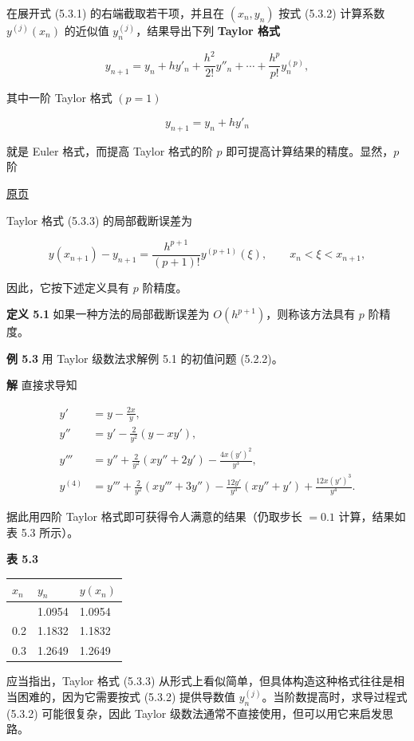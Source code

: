\documentclass[
  10pt,
  fontset=fandol]{ctexart}
\newcounter{none} %
\begin{document}
在展开式 (5.3.1) 的右端截取若干项，并且在 \((x_n,y_n)\) 按式 (5.3.2) 计算系数 \(y^{(j)}(x_n)\) 的近似值 \(y_n^{(j)}\)，结果导出下列 \textbf{Taylor 格式}

\[
y_{n+1}=y_n+hy'_n+\frac{h^2}{2!}y''_n+\cdots+\frac{h^p}{p!}y_n^{(p)},\tag{5.3.3}
\]

其中一阶 Taylor 格式 \((p=1)\)

\[
y_{n+1}=y_n+hy'_n
\]

就是 Euler 格式，而提高 Taylor 格式的阶 \(p\) 即可提高计算结果的精度。显然，\(p\) 阶

\href{../../source-images/pdf-127.jpeg}{原页}

Taylor 格式 (5.3.3) 的局部截断误差为

\[
y(x_{n+1})-y_{n+1}=\frac{h^{p+1}}{(p+1)!}y^{(p+1)}(\xi),\qquad x_n<\xi<x_{n+1},
\]

因此，它按下述定义具有 \(p\) 阶精度。

\textbf{定义 5.1} 如果一种方法的局部截断误差为 \(O(h^{p+1})\)，则称该方法具有 \(p\) 阶精度。

\textbf{例 5.3} 用 Taylor 级数法求解例 5.1 的初值问题 (5.2.2)。

\textbf{解} 直接求导知

\[
\begin{aligned}
y'&=y-\frac{2x}{y},\\
y''&=y'-\frac{2}{y^2}(y-xy'),\\
y'''&=y''+\frac{2}{y^2}(xy''+2y')-\frac{4x(y')^2}{y^3},\\
y^{(4)}&=y'''+\frac{2}{y^2}(xy'''+3y'')-\frac{12y'}{y^3}(xy''+y')+\frac{12x(y')^3}{y^4}.
\end{aligned}
\]

据此用四阶 Taylor 格式即可获得令人满意的结果（仍取步长 \(=0.1\) 计算，结果如表 5.3 所示）。

\textbf{表 5.3}

{\def\LTcaptype{none} %
\begin{longtable}[]{@{}lll@{}}
\toprule\noalign{}
\(x_n\) & \(y_n\) & \(y(x_n)\) \\
\midrule\noalign{}
\endhead
\bottomrule\noalign{}
\endlastfoot
0.1 & 1.0954 & 1.0954 \\
0.2 & 1.1832 & 1.1832 \\
0.3 & 1.2649 & 1.2649 \\
\end{longtable}
}

应当指出，Taylor 格式 (5.3.3) 从形式上看似简单，但具体构造这种格式往往是相当困难的，因为它需要按式 (5.3.2) 提供导数值 \(y_n^{(j)}\)。当阶数提高时，求导过程式 (5.3.2) 可能很复杂，因此 Taylor 级数法通常不直接使用，但可以用它来启发思路。
\end{document}
